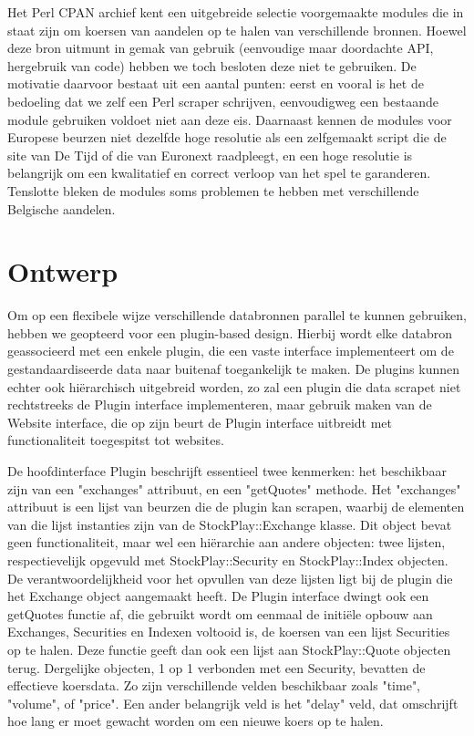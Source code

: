 Het Perl CPAN archief kent een uitgebreide selectie voorgemaakte modules die in staat zijn om koersen van aandelen op te halen van verschillende bronnen. Hoewel deze bron uitmunt in gemak van gebruik (eenvoudige maar doordachte API, hergebruik van code) hebben we toch besloten deze niet te gebruiken. De motivatie daarvoor bestaat uit een aantal punten: eerst en vooral is het de bedoeling dat we zelf een Perl scraper schrijven, eenvoudigweg een bestaande module gebruiken voldoet niet aan deze eis. Daarnaast kennen de modules voor Europese beurzen niet dezelfde hoge resolutie als een zelfgemaakt script die de site van De Tijd of die van Euronext raadpleegt, en een hoge resolutie is belangrijk om een kwalitatief en correct verloop van het spel te garanderen. Tenslotte bleken de modules soms problemen te hebben met verschillende Belgische aandelen.

\section{Ontwerp}

Om op een flexibele wijze verschillende databronnen parallel te kunnen gebruiken, hebben we geopteerd voor een plugin-based design. Hierbij wordt elke databron geassocieerd met een enkele plugin, die een vaste interface implementeert om de gestandaardiseerde data naar buitenaf toegankelijk te maken. De plugins kunnen echter ook hi\"erarchisch uitgebreid worden, zo zal een plugin die data scrapet niet rechtstreeks de Plugin interface implementeren, maar gebruik maken van de Website interface, die op zijn beurt de Plugin interface uitbreidt met functionaliteit toegespitst tot websites.

De hoofdinterface Plugin beschrijft essentieel twee kenmerken: het beschikbaar zijn van een "exchanges" attribuut, en een "getQuotes" methode. Het "exchanges" attribuut is een lijst van beurzen die de plugin kan scrapen, waarbij de elementen van die lijst instanties zijn van de StockPlay::Exchange klasse. Dit object bevat geen functionaliteit, maar wel een hi\"erarchie aan andere objecten: twee lijsten, respectievelijk opgevuld met StockPlay::Security en StockPlay::Index objecten. De verantwoordelijkheid voor het opvullen van deze lijsten ligt bij de plugin die het Exchange object aangemaakt heeft.
De Plugin interface dwingt ook een getQuotes functie af, die gebruikt wordt om eenmaal de initi\"ele opbouw aan Exchanges, Securities en Indexen voltooid is, de koersen van een lijst Securities op te halen. Deze functie geeft dan ook een lijst aan StockPlay::Quote objecten terug. Dergelijke objecten, 1 op 1 verbonden met een Security, bevatten de effectieve koersdata. Zo zijn verschillende velden beschikbaar zoals "time", "volume", of "price". Een ander belangrijk veld is het "delay" veld, dat omschrijft hoe lang er moet gewacht worden om een nieuwe koers op te halen.

